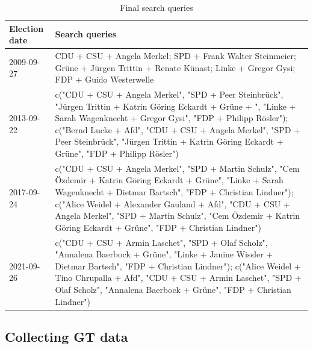 \documentclass[
  letterpaper,
  DIV=11,
  numbers=noendperiod]{scrartcl}
\begin{document}
\hypertarget{tbl-2}{}
\begin{table}
\caption{\label{tbl-2}Final search queries }\tabularnewline

\centering\begingroup\fontsize{10}{12}\selectfont

\begin{tabular}{l>{\raggedright\arraybackslash}p{5in}}
\toprule
Election date & Search queries\\
\midrule
2009-09-27 & CDU + CSU + Angela Merkel; SPD + Frank Walter Steinmeier; Grüne + Jürgen Trittin + Renate Künast; Linke + Gregor Gysi; FDP + Guido Westerwelle\\
2013-09-22 & c("CDU + CSU + Angela Merkel", "SPD + Peer Steinbrück", "Jürgen Trittin + Katrin Göring Eckardt + Grüne + ", "Linke + Sarah Wagenknecht + Gregor Gysi", "FDP + Philipp Rösler"); c("Bernd Lucke + Afd", "CDU + CSU + Angela Merkel", "SPD + Peer Steinbrück", "Jürgen Trittin + Katrin Göring Eckardt + Grüne", "FDP + Philipp Rösler")\\
2017-09-24 & c("CDU + CSU + Angela Merkel", "SPD + Martin Schulz", "Cem Özdemir + Katrin Göring Eckardt + Grüne", "Linke + Sarah Wagenknecht + Dietmar Bartsch", "FDP + Christian Lindner"); c("Alice Weidel + Alexander Gauland + Afd", "CDU + CSU + Angela Merkel", "SPD + Martin Schulz", "Cem Özdemir + Katrin Göring Eckardt + Grüne", "FDP + Christian Lindner")\\
2021-09-26 & c("CDU + CSU + Armin Laschet", "SPD + Olaf Scholz", "Annalena Baerbock + Grüne", "Linke + Janine Wissler + Dietmar Bartsch", "FDP + Christian Lindner"); c("Alice Weidel + Tino Chrupalla + Afd", "CDU + CSU + Armin Laschet", "SPD + Olaf Scholz", "Annalena Baerbock + Grüne", "FDP + Christian Lindner")\\
\bottomrule
\end{tabular}
\endgroup{}
\end{table}

\hypertarget{collecting-gt-data}{%
\subsection{Collecting GT data}\label{collecting-gt-data}}
\end{document}
